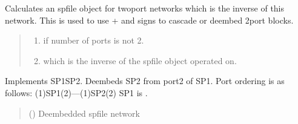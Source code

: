 \documentclass[letterpaper,10pt,english]{sphinxmanual}
\begin{document}
\begin{fulllineitems}
\begin{fulllineitems}
\label{\detokenize{touchstone:touchstone.spfile.__neg__}}
\pysigstartsignatures
{}
\pysigstopsignatures
\sphinxAtStartPar
Calculates an spfile object for two\sphinxhyphen{}port networks which is the inverse of this network. This is used to use + and \sphinxhyphen{} signs to cascade or deembed 2\sphinxhyphen{}port blocks.
\begin{quote}\begin{description}
\sphinxAtStartPar
\begin{enumerate}
%
\item {}
\sphinxAtStartPar
{} if number of ports is not 2.

\item {}
\sphinxAtStartPar
{} which is the inverse of the spfile object operated on.

\end{enumerate}


\sphinxAtStartPar
{\hyperref[\detokenize{touchstone:touchstone.spfile}]{}}

\end{description}\end{quote}

\end{fulllineitems}


\begin{fulllineitems}
\label{\detokenize{touchstone:touchstone.spfile.__sub__}}
\pysigstartsignatures
{}
\pysigstopsignatures
\sphinxAtStartPar
Implements SP1\sphinxhyphen{}SP2.
Deembeds SP2 from port\sphinxhyphen{}2 of SP1.
Port ordering is as follows:
(1)\sphinxhyphen{}SP1\sphinxhyphen{}(2)—(1)\sphinxhyphen{}SP2\sphinxhyphen{}(2)
SP1 is .
\begin{quote}\begin{description}
\sphinxAtStartPar
{} ({\hyperref[\detokenize{touchstone:touchstone.spfile}]{}}) \textendash{} Deembedded spfile network


\end{description}
\end{quote}
\end{fulllineitems}
\end{fulllineitems}
\end{document}
